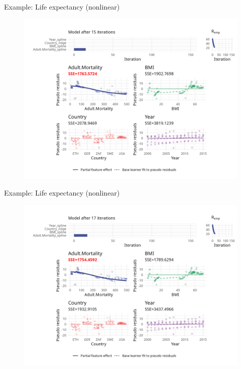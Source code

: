 \begin{frame}{Example: Life expectancy (nonlinear)}
	\begin{figure}
		\centering
		\includegraphics[width=\textwidth]{figure/cwb-anim-nl/fig-iter-0015.png}
	\end{figure}
	\addtocounter{framenumber}{-1}
\end{frame}


\begin{frame}{Example: Life expectancy (nonlinear)}
	\begin{figure}
		\centering
		\includegraphics[width=\textwidth]{figure/cwb-anim-nl/fig-iter-0017.png}
	\end{figure}
	\addtocounter{framenumber}{-1}
\end{frame}


